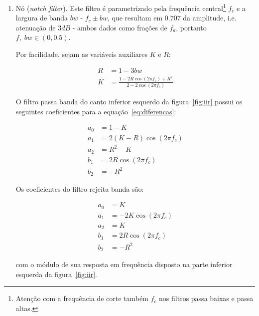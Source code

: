 \begin{enumerate}
\item Nó (\emph{notch filter}). Este filtro é parametrizado
pela frequência central\footnote{ Atenção com a frequência de corte também $f_c$ nos filtros passa baixas e passa altas.} $f_c$
e a largura de banda $bw$
- $f_c \pm bw$, que resultam em $0.707$ da amplitude, i.e. atenuação de $3dB$ -
ambos dados como frações de $f_a$, portanto $f,\; bw \in (0,0.5)$.

Por facilidade, sejam as variáveis auxiliares $K$ e $R$:

\begin{equation}
\begin{split}
R & = 1 - 3bw \\
K & = \frac{1-2R\cos(2\pi f_c) + R^2}{2 - 2 \cos (2 \pi f_c)}
\end{split}
\end{equation}

O filtro passa banda do canto inferior esquerdo da figura~\ref{fig:iir}
possui os seguintes coeficientes para a equação~\ref{eq:diferencas}:

\begin{equation}\label{eq:passa-banda}
\begin{split}
a_0 & =  1 - K \\
a_1 & =  2(K-R)\cos (2\pi f_c) \\
a_2 & =  R^2-K \\
b_1 & =  2R \cos (2\pi f_c) \\
b_2 & =  -R^2
\end{split}
\end{equation}

Os coeficientes do filtro rejeita banda são:

\begin{equation}\label{eq:rejeita-banda}
\begin{split}
a_0 & =  K \\
a_1 & =  -2K\cos (2\pi f_c) \\
a_2 & =  K \\
b_1 & =  2R \cos (2\pi f_c) \\
b_2 & =  -R^2
\end{split}
\end{equation}

com o módulo de sua resposta em frequência 
disposto na parte inferior esquerda da figura~\ref{fig:iir}.


\end{enumerate}

